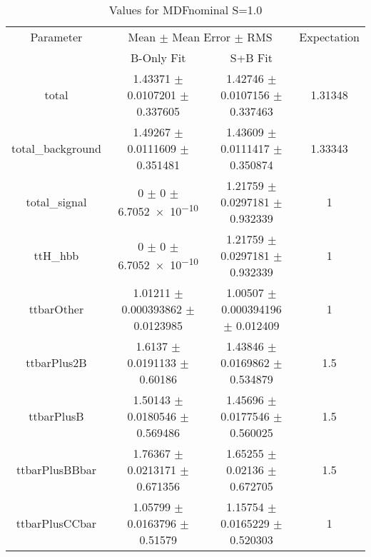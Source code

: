 \begin{table}
\centering
\caption{Values for MDFnominal S=1.0}
\begin{tabular}{cccc}
\toprule
Parameter & \multicolumn{2}{c}{Mean $\pm$ Mean Error $\pm$ RMS} & Expectation\\
 & B-Only Fit & S+B Fit & \\
\midrule
total & \num{1.43371} $\pm$ \num{0.0107201} $\pm$ \num{0.337605} & \num{1.42746} $\pm$ \num{0.0107156} $\pm$ \num{0.337463} & \num{1.31348}\\
total\_background & \num{1.49267} $\pm$ \num{0.0111609} $\pm$ \num{0.351481} & \num{1.43609} $\pm$ \num{0.0111417} $\pm$ \num{0.350874} & \num{1.33343}\\
total\_signal & \num{0} $\pm$ \num{0} $\pm$ \num{6.7052e-10} & \num{1.21759} $\pm$ \num{0.0297181} $\pm$ \num{0.932339} & \num{1}\\
ttH\_hbb & \num{0} $\pm$ \num{0} $\pm$ \num{6.7052e-10} & \num{1.21759} $\pm$ \num{0.0297181} $\pm$ \num{0.932339} & \num{1}\\
ttbarOther & \num{1.01211} $\pm$ \num{0.000393862} $\pm$ \num{0.0123985} & \num{1.00507} $\pm$ \num{0.000394196} $\pm$ \num{0.012409} & \num{1}\\
ttbarPlus2B & \num{1.6137} $\pm$ \num{0.0191133} $\pm$ \num{0.60186} & \num{1.43846} $\pm$ \num{0.0169862} $\pm$ \num{0.534879} & \num{1.5}\\
ttbarPlusB & \num{1.50143} $\pm$ \num{0.0180546} $\pm$ \num{0.569486} & \num{1.45696} $\pm$ \num{0.0177546} $\pm$ \num{0.560025} & \num{1.5}\\
ttbarPlusBBbar & \num{1.76367} $\pm$ \num{0.0213171} $\pm$ \num{0.671356} & \num{1.65255} $\pm$ \num{0.02136} $\pm$ \num{0.672705} & \num{1.5}\\
ttbarPlusCCbar & \num{1.05799} $\pm$ \num{0.0163796} $\pm$ \num{0.51579} & \num{1.15754} $\pm$ \num{0.0165229} $\pm$ \num{0.520303} & \num{1}\\
\bottomrule
\end{tabular}
\end{table}